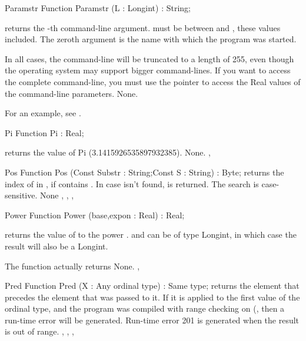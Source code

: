 \documentclass{report}
\begin{document}

\begin{function}{Paramstr}
\Declaration
Function Paramstr (L : Longint) : String;

\Description
{} returns the -th command-line argument.  must
be between  and , these values included.
The zeroth argument is the name with which the program was started.

In all cases, the command-line will be truncated to a length of 255,
even though the operating system may support bigger command-lines. If you
want to access the complete command-line, you must use the  pointer
to access the Real values of the command-line parameters.
\Errors
None.
\SeeAlso
{}
\end{function}
For an example, see .
\begin{function}{Pi}
\Declaration
Function Pi  : Real;

\Description
{} returns the value of Pi (3.1415926535897932385).
\Errors
None.
\SeeAlso
{}, 
\end{function}


\begin{function}{Pos}
\Declaration
Function Pos (Const Substr : String;Const S : String) : Byte;
\Description
{} returns the index of  in , if  contains
. In case  isn't found,  is returned.
The search is case-sensitive.
\Errors
None
\SeeAlso
{}, , , 
\end{function}


\begin{function}{Power}
\Declaration
Function Power (base,expon : Real) : Real;
\Description

 returns the value of  to the power .
 and  can be of type Longint, in which case the
result will also be a Longint.

The function actually returns 
\Errors
None.
\SeeAlso
{}, 
\end{function}


\begin{function}{Pred}
\Declaration
Function Pred (X : Any ordinal type) : Same type;
\Description
  returns the element that precedes the element that was passed
to it. If it is applied to the first value of the ordinal type, and the
program was compiled with range checking on (, then a run-time
error will be generated.
\Errors
Run-time error 201 is generated when the result is out of
range.
\SeeAlso
{}, , , 
\end{function}
\end{document}
